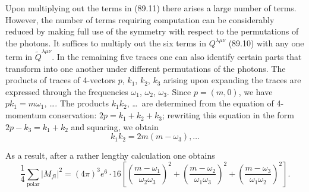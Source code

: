 Upon multiplying out the terms in (89.11) there arises a large number of terms. However, the number of terms requiring computation can be considerably reduced by making full use of the symmetry with respect to the permutations of the photons. It suffices to multiply out the six terms in $Q^{\lambda\mu\nu}$ (89.10) with any one term in $\widetilde{Q}^{\lambda\mu\nu}$. In the remaining five traces one can also identify certain parts that transform into one another under different permutations of the photons. The products of traces of 4-vectors $p$, $k_1$, $k_2$, $k_3$ arising upon expanding the traces are expressed through the frequencies $\omega_1$, $\omega_2$, $\omega_3$. Since $p = (m, 0)$, we have $pk_1 = m\omega_1$, \dots. The products $k_1 k_2$, \dots\ are determined from the equation of 4-momentum conservation: $2p = k_1 + k_2 + k_3$; rewriting this equation in the form $2p - k_3 = k_1 + k_2$ and squaring, we obtain
\begin{equation}
k_1 k_2 = 2m(m - \omega_3), \ldots
\label{eq:89.12}
\end{equation}


As a result, after a rather lengthy calculation one obtains
\[
\frac{1}{4}\sum_\text{polar} |M_{fi}|^2 = (4\pi)^3 e^6 \cdot 16\left[\left(\frac{m-\omega_1}{\omega_2\omega_3}\right)^{\!2} + \left(\frac{m-\omega_2}{\omega_1\omega_3}\right)^{\!2} + \left(\frac{m-\omega_3}{\omega_1\omega_2}\right)^{\!2}\right].
\]

